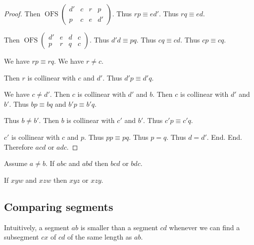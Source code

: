 \documentclass[10pt,a4paper,parskip=half,numbers=endperiod,headings=standardclasses,parskip]{scrartcl}
\newcommand{\Cong}[4]{#1 #2 \equiv #3 #4}
\newcommand{\Betw}[3]{#1 #2 #3}
\newcommand{\bprime}{b'}
\newcommand{\cprime}{c'}
\def\dprime{d'}
\newcommand{\OFS}[8]{\operatorname{OFS}%
\left(
\begin{smallmatrix}%
#1 & #2 & #3 & #4 \\
#5 & #6 & #7 & #8
\end{smallmatrix}%
\right)%
}
\begin{document}
\begin{forthel}
\begin{proof}
          Then $\OFS{\dprime}{c}{r}{p}{p}{c}{e}{\dprime}$.
          Thus $\Cong{r}{p}{e}{\dprime}$.
          Thus $\Cong{r}{q}{e}{d}$.

          Then $\OFS{\dprime}{e}{d}{c}{p}{r}{q}{c}$.
          Thus $\Cong{\dprime}{d}{p}{q}$.
          Thus $\Cong{c}{q}{c}{d}$.
          Thus $\Cong{c}{p}{c}{q}$.

          We have $\Cong{r}{p}{r}{q}$.
          We have $r \neq c$.

          Then $r$ is collinear with $c$ and $\dprime$.
          Thus $\Cong{\dprime}{p}{\dprime}{q}$.

          We have $c \neq \dprime$.
          Then $c$ is collinear with $\dprime$ and $b$.
          Then $c$ is collinear with $\dprime$ and $\bprime$.
          Thus $\Cong{b}{p}{b}{q}$ and $\Cong{\bprime}{p}{\bprime}{q}$.

          Thus $b \neq \bprime$.
          Then $b$ is collinear with $\cprime$ and $\bprime$.
          Thus $\Cong{\cprime}{p}{\cprime}{q}$.

          $\cprime$ is collinear with $c$ and $p$.
          Thus $\Cong{p}{p}{p}{q}$.
          Thus $p = q$.
          Thus $d = \dprime$.
        End.
      End.
      Therefore $\Betw{a}{c}{d}$ or $\Betw{a}{d}{c}$. %
    \end{proof}
  \end{forthel}

  \begin{forthel}
    \begin{lemma} %
      Assume $a \neq b$.
      If $\Betw{a}{b}{c}$ and $\Betw{a}{b}{d}$
      then $\Betw{b}{c}{d}$ or $\Betw{b}{d}{c}$.
    \end{lemma}

    \begin{theorem} %
      If $\Betw{x}{y}{w}$ and $\Betw{x}{z}{w}$ then $\Betw{x}{y}{z}$ or $\Betw{x}{z}{y}$.
    \end{theorem}
  \end{forthel}

  \subsection{Comparing segments}

  Intuitively, a segment $ab$ is smaller than a segment $cd$ whenever we can find a subsegment $cx$
  of $cd$ of the same length as $ab$.

\end{document}
